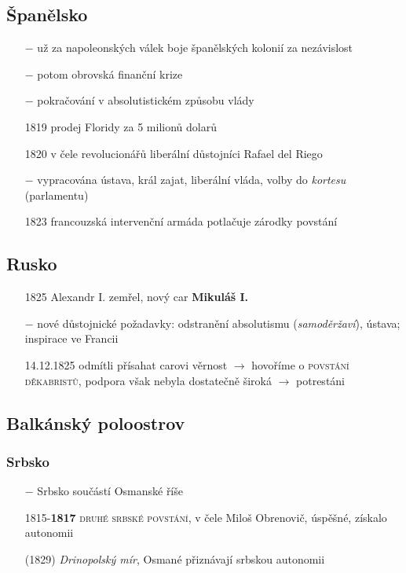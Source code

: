 \documentclass{article}
\begin{document}
\subsection*{Španělsko}
\begin{itemize}
    \vspace{-0.5em}
    \setlength\itemsep{0.15em}
    \item[$-$] už za napoleonských válek boje španělských kolonií za nezávislost
    \item[$-$] potom obrovská finanční krize
    \item[$-$] pokračování v absolutistickém způsobu vlády
    \item[1819] prodej Floridy za 5 milionů dolarů
    \item[1820] v čele revolucionářů liberální důstojníci Rafael del Riego
    \item[$-$] vypracována ústava, král zajat, liberální vláda, volby do \textit{kortesu} (parlamentu)
    \item[1823] francouzská intervenční armáda potlačuje zárodky povstání
\end{itemize}

\subsection*{Rusko}
\begin{itemize}
    \vspace{-0.5em}
    \setlength\itemsep{0.15em}
    \item[1825] Alexandr I. zemřel, nový car \textbf{Mikuláš I.}
    \item[$-$] nové důstojnické požadavky: odstranění absolutismu (\textit{samoděržaví}), ústava; inspirace ve Francii
    \item[14.12.1825] odmítli přísahat carovi věrnost $\rightarrow$ hovoříme o \textsc{povstání děkabristů}, podpora však nebyla dostatečně široká $\rightarrow$ potrestáni
\end{itemize}


\subsection*{Balkánský poloostrov}
\subsubsection*{Srbsko}
\begin{itemize}
    \vspace{-0.5em}
    \setlength\itemsep{0.15em}
    \item[$-$] Srbsko součástí Osmanské říše
    \item[1815-\textbf{1817}] \textsc{druhé srbské povstání}, v čele Miloš Obrenovič, úspěšné, získalo autonomii
    \item[(1829)] \textit{Drinopolský mír}, Osmané přiznávají srbskou autonomii
\end{itemize}
\end{document}
